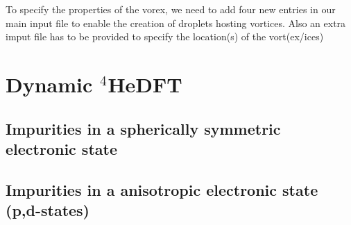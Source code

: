 \documentclass[10pt,a4paper]{article}
\begin{document}
	To specify the properties of the vorex, we need to add four new entries in our main input file to enable the creation of droplets hosting vortices. Also an extra imput file has to be provided to specify the location(s) of the vort(ex/ices)
	
	\section{Dynamic $^4$HeDFT}
	
	\subsection{Impurities in a spherically symmetric electronic state}
	\subsection{Impurities in a anisotropic electronic state (p,d-states)}
	
\end{document}
